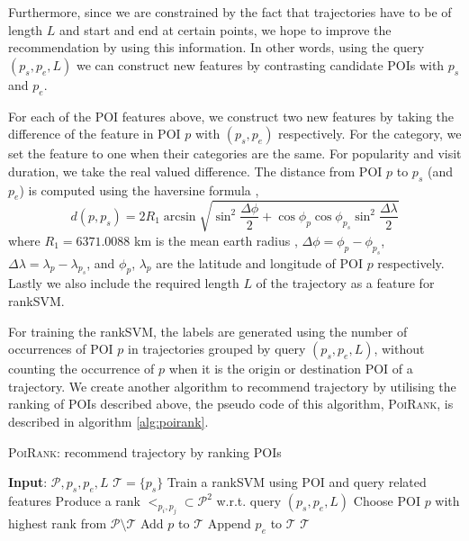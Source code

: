 Furthermore, since we are constrained by the fact that trajectories have to be of length $L$ and start and end at certain points, we hope to improve the recommendation by using this information.
In other words, using the query $(p_s, p_e, L)$ we can construct new features by contrasting
candidate POIs with $p_s$ and $p_e$.

For each of the POI features above, we construct two new features by taking the difference of
the feature in POI $p$ with $(p_s, p_e)$ respectively.
For the category, we set the feature to one when their categories are the same.
For popularity and visit duration, we take the real valued difference.
The distance from POI $p$ to $p_s$ (and $p_e$) is computed using the haversine formula \cite{haversine},
\begin{displaymath}
  d(p, p_s) = 2 R_1 \arcsin \sqrt{ \sin^2 \frac{\Delta \phi}{2} +
    \cos \phi_p \cos \phi_{p_s} \sin^2 \frac{\Delta \lambda}{2} }
\end{displaymath}
where $R_1 = 6371.0088$ km is the mean earth radius \cite{earth_radius},
$\Delta \phi = \phi_p - \phi_{p_s}$, $\Delta \lambda = \lambda_p - \lambda_{p_s}$,
and $\phi_p$, $\lambda_p$ are the latitude and longitude of POI $p$ respectively.
Lastly we also include the required length $L$ of the trajectory as a feature for rankSVM.

For training the rankSVM, the labels are generated using the number of occurrences of
POI $p$ in trajectories grouped by query $(p_s, p_e, L)$,
without counting the occurrence of $p$ when it is the origin or destination POI of a trajectory.
We create another algorithm to recommend trajectory by utilising
the ranking of POIs described above,
the pseudo code of this algorithm, \textsc{PoiRank}, is described in algorithm \ref{alg:poirank}.


\begin{algorithm}
\caption{\textsc{PoiRank}: recommend trajectory by ranking POIs}
\label{alg:poirank}
\begin{algorithmic}[1]
\STATE \textbf{Input}: $\mathcal{P}, p_s, p_e, L$ 
\STATE $\mathcal{T} = \{p_s\}$
\STATE Train a rankSVM using POI and query related features
\STATE Produce a rank $<_{p_i, p_j} \subset \mathcal{P}^2$ w.r.t. query $(p_s, p_e, L)$
\REPEAT
    \STATE Choose POI $p$ with highest rank from $\mathcal{P} \setminus \mathcal{T}$
    \STATE Add $p$ to $\mathcal{T}$
\STATE Append $p_e$ to $\mathcal{T}$
\RETURN $\mathcal{T}$
\end{algorithmic}
\end{algorithm}


